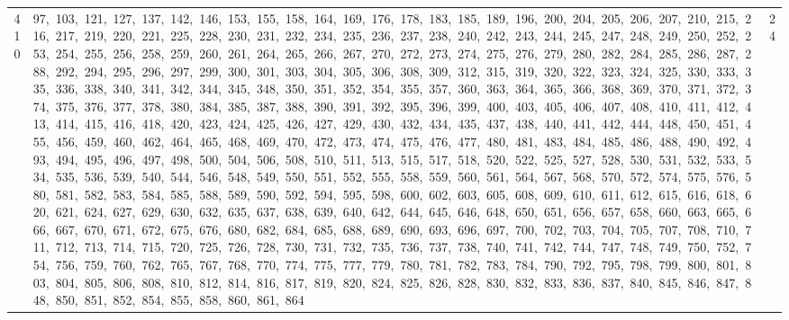 \begin{longtable}{c|p{}|r}
410 & 97,\ 103,\ 121,\ 127,\ 137,\ 142,\ 146,\ 153,\ 155,\ 158,\ 164,\ 169,\ 176,\ 178,\ 183,\ 185,\ 189,\ 196,\ 200,\ 204,\ 205,\ 206,\ 207,\ 210,\ 215,\ 216,\ 217,\ 219,\ 220,\ 221,\ 225,\ 228,\ 230,\ 231,\ 232,\ 234,\ 235,\ 236,\ 237,\ 238,\ 240,\ 242,\ 243,\ 244,\ 245,\ 247,\ 248,\ 249,\ 250,\ 252,\ 253,\ 254,\ 255,\ 256,\ 258,\ 259,\ 260,\ 261,\ 264,\ 265,\ 266,\ 267,\ 270,\ 272,\ 273,\ 274,\ 275,\ 276,\ 279,\ 280,\ 282,\ 284,\ 285,\ 286,\ 287,\ 288,\ 292,\ 294,\ 295,\ 296,\ 297,\ 299,\ 300,\ 301,\ 303,\ 304,\ 305,\ 306,\ 308,\ 309,\ 312,\ 315,\ 319,\ 320,\ 322,\ 323,\ 324,\ 325,\ 330,\ 333,\ 335,\ 336,\ 338,\ 340,\ 341,\ 342,\ 344,\ 345,\ 348,\ 350,\ 351,\ 352,\ 354,\ 355,\ 357,\ 360,\ 363,\ 364,\ 365,\ 366,\ 368,\ 369,\ 370,\ 371,\ 372,\ 374,\ 375,\ 376,\ 377,\ 378,\ 380,\ 384,\ 385,\ 387,\ 388,\ 390,\ 391,\ 392,\ 395,\ 396,\ 399,\ 400,\ 403,\ 405,\ 406,\ 407,\ 408,\ 410,\ 411,\ 412,\ 413,\ 414,\ 415,\ 416,\ 418,\ 420,\ 423,\ 424,\ 425,\ 426,\ 427,\ 429,\ 430,\ 432,\ 434,\ 435,\ 437,\ 438,\ 440,\ 441,\ 442,\ 444,\ 448,\ 450,\ 451,\ 455,\ 456,\ 459,\ 460,\ 462,\ 464,\ 465,\ 468,\ 469,\ 470,\ 472,\ 473,\ 474,\ 475,\ 476,\ 477,\ 480,\ 481,\ 483,\ 484,\ 485,\ 486,\ 488,\ 490,\ 492,\ 493,\ 494,\ 495,\ 496,\ 497,\ 498,\ 500,\ 504,\ 506,\ 508,\ 510,\ 511,\ 513,\ 515,\ 517,\ 518,\ 520,\ 522,\ 525,\ 527,\ 528,\ 530,\ 531,\ 532,\ 533,\ 534,\ 535,\ 536,\ 539,\ 540,\ 544,\ 546,\ 548,\ 549,\ 550,\ 551,\ 552,\ 555,\ 558,\ 559,\ 560,\ 561,\ 564,\ 567,\ 568,\ 570,\ 572,\ 574,\ 575,\ 576,\ 580,\ 581,\ 582,\ 583,\ 584,\ 585,\ 588,\ 589,\ 590,\ 592,\ 594,\ 595,\ 598,\ 600,\ 602,\ 603,\ 605,\ 608,\ 609,\ 610,\ 611,\ 612,\ 615,\ 616,\ 618,\ 620,\ 621,\ 624,\ 627,\ 629,\ 630,\ 632,\ 635,\ 637,\ 638,\ 639,\ 640,\ 642,\ 644,\ 645,\ 646,\ 648,\ 650,\ 651,\ 656,\ 657,\ 658,\ 660,\ 663,\ 665,\ 666,\ 667,\ 670,\ 671,\ 672,\ 675,\ 676,\ 680,\ 682,\ 684,\ 685,\ 688,\ 689,\ 690,\ 693,\ 696,\ 697,\ 700,\ 702,\ 703,\ 704,\ 705,\ 707,\ 708,\ 710,\ 711,\ 712,\ 713,\ 714,\ 715,\ 720,\ 725,\ 726,\ 728,\ 730,\ 731,\ 732,\ 735,\ 736,\ 737,\ 738,\ 740,\ 741,\ 742,\ 744,\ 747,\ 748,\ 749,\ 750,\ 752,\ 754,\ 756,\ 759,\ 760,\ 762,\ 765,\ 767,\ 768,\ 770,\ 774,\ 775,\ 777,\ 779,\ 780,\ 781,\ 782,\ 783,\ 784,\ 790,\ 792,\ 795,\ 798,\ 799,\ 800,\ 801,\ 803,\ 804,\ 805,\ 806,\ 808,\ 810,\ 812,\ 814,\ 816,\ 817,\ 819,\ 820,\ 824,\ 825,\ 826,\ 828,\ 830,\ 832,\ 833,\ 836,\ 837,\ 840,\ 845,\ 846,\ 847,\ 848,\ 850,\ 851,\ 852,\ 854,\ 855,\ 858,\ 860,\ 861,\ 864 & 24 \\

\end{longtable}
